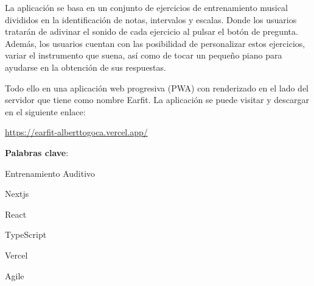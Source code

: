 \documentclass[12pt,twoside,titlepage]{report}
\newcommand\blankpage{%
    \newpage
    \null
    \thispagestyle{empty}%
    \newpage}
\begin{document}
La aplicación se basa en un conjunto de ejercicios de entrenamiento musical divididos en la identificación de notas, intervalos y escalas. Donde los usuarios tratarán de adivinar el sonido de cada ejercicio al pulsar el botón de pregunta. Además, los usuarios cuentan con las posibilidad de personalizar estos ejercicios, variar el instrumento que suena, así como de tocar un pequeño piano para ayudarse en la obtención de sus respuestas.

Todo ello en una aplicación web progresiva (PWA) con renderizado en el lado del servidor que tiene como nombre Earfit. La aplicación se puede visitar y descargar en el siguiente enlace:

\url{https://earfit-alberttogoca.vercel.app/}

\mbox{} \bigskip

\noindent \textbf{Palabras clave}:
\begin{compactitem}
    \item Entrenamiento Auditivo
    \item Nextjs
    \item React
    \item TypeScript
    \item Vercel
    \item Agile
\end{compactitem}

\afterpage{\blankpage}


 

\setlength{\parskip}{1pt}
\renewcommand{\baselinestretch}{1}
\renewcommand{\contentsname}{Índice de contenidos}

\tableofcontents
\afterpage{\blankpage}

\listoffigures
\afterpage{\blankpage}


\end{document}
